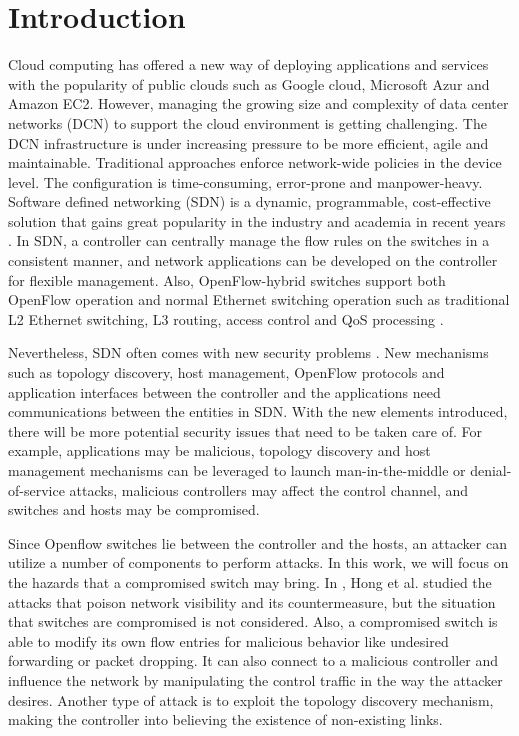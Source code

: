 \chapter{Introduction}
\label{chap:intro}
\setcounter{page}{1}

Cloud computing has offered a new way of deploying applications and services with the popularity of public clouds such as Google cloud, Microsoft Azur and Amazon EC2. However, managing the growing size and complexity of data center networks (DCN) to support the cloud environment is getting challenging. The DCN infrastructure is under increasing pressure to be more efficient, agile and maintainable. Traditional approaches enforce network-wide policies in the device level. The configuration is time-consuming, error-prone and manpower-heavy. Software defined networking (SDN) is a dynamic, programmable, cost-effective solution that gains great popularity in the industry and academia in recent years \cite{KRVRAU15, MABPPRST08, LHM10}. In SDN, a controller can centrally manage the flow rules on the switches in a consistent manner, and network applications can be developed on the controller for flexible management. Also, OpenFlow-hybrid switches support both OpenFlow operation and normal Ethernet switching operation such as traditional L2 Ethernet switching, L3 routing, access control and QoS processing \cite{OF_SPEC}.

Nevertheless, SDN often comes with new security problems \cite{SOS13,CM}. New mechanisms such as topology discovery, host management, OpenFlow protocols and application interfaces between the controller and the applications need communications between the entities in SDN. With the new elements introduced, there will be more potential security issues that need to be taken care of. For example, applications may be malicious, topology discovery and host management mechanisms can be leveraged to launch man-in-the-middle or denial-of-service attacks, malicious controllers may affect the control channel, and switches and hosts may be compromised.

Since Openflow switches lie between the controller and the hosts, an attacker can utilize a number of components to perform attacks. In this work, we will focus on the hazards that a compromised switch may bring. In \cite{HXWG15}, Hong et al. studied the attacks that poison network visibility and its countermeasure, but the situation that switches are compromised is not considered. Also, a compromised switch is able to modify its own flow entries for malicious behavior like undesired forwarding or packet dropping. It can also connect to a malicious controller and influence the network by manipulating the control traffic in the way the attacker desires\sout{}. Another type of attack is to exploit the topology discovery mechanism, making the controller into believing the existence of non-existing links.

